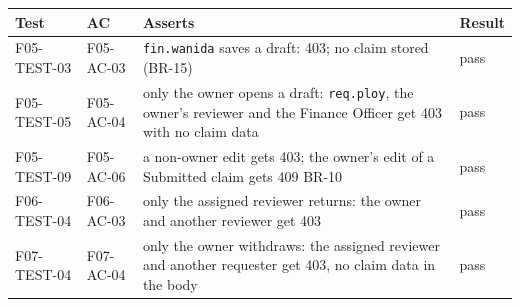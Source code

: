 \begin{center}\small
\begin{tabular}{@{}llp{8.4cm}l@{}}
\toprule \textbf{Test} & \textbf{AC} & \textbf{Asserts} & \textbf{Result} \\ \midrule
F05-TEST-03 & F05-AC-03 & \texttt{fin.wanida} saves a draft: 403; no claim stored (BR-15) & pass \\
F05-TEST-05 & F05-AC-04 & only the owner opens a draft: \texttt{req.ploy}, the owner's reviewer and the Finance Officer get 403 with no claim data & pass \\
F05-TEST-09 & F05-AC-06 & a non-owner edit gets 403; the owner's edit of a Submitted claim gets 409 BR-10 & pass \\
F06-TEST-04 & F06-AC-03 & only the assigned reviewer returns: the owner and another reviewer get 403 & pass \\
F07-TEST-04 & F07-AC-04 & only the owner withdraws: the assigned reviewer and another requester get 403, no claim data in the body & pass \\
\bottomrule
\end{tabular}
\end{center}
